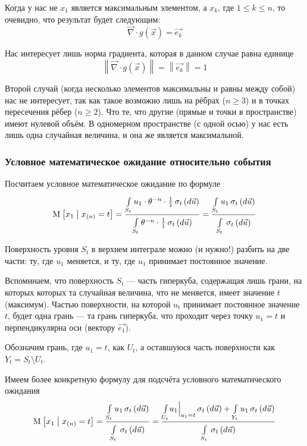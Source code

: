 Когда у нас не $x_1$ является максимальным элементом, а $x_k$,
где $1 \le k \le n$, то очевидно, что результат будет следующим:
$$\vec{\nabla} \cdot g\left( \vec{x} \right) = \vec{e_k}$$

Нас интересует лишь норма градиента, которая в данном случае равна единице
$$\left\| \vec{\nabla} \cdot g\left( \vec{x} \right) \right\|
    = \left\| \vec{e_k} \right\| = 1$$

Второй случай (когда несколько элементов максимальны и равны между собой)
нас не интересует, так как такое возможно лишь на рёбрах ($n \ge 3$) и в точках
пересечения рёбер ($n \ge 2$).
Что те, что другие (прямые и точки в пространстве) имеют нулевой объём.
В одномерном пространстве (с одной осью) у нас есть лишь одна
случайная величина, и она же является максимальной.

\subsubsection{Условное математическое ожидание относительно события}
Посчитаем условное математическое ожидание по формуле
\begin{align*}
    \Mean{x_1 \mcond x_{\left( n \right)} = t}
        = \frac{\integrall{S_t}{
                    \sigma_{t}\left(d\vec{u} \right)}{
                    u_1 \cdot \theta^{-n} \cdot \frac{1}{1}}}
                {\integrall{S_t}{\sigma_{t}\left(d\vec{u} \right)}{
                    \theta^{-n} \cdot \frac{1}{1}}}
        = \frac{\integrall{S_t}{
                    \sigma_{t}\left(d\vec{u} \right)}{u_1}}{
                \integrall{S_t}{
                    \sigma_{t}\left(d\vec{u} \right)}{}}
\end{align*}

Поверхность уровня $S_t$ в верхнем интеграле можно (и нужно!)
разбить на две части: ту, где $u_1$ меняется, и ту, где $u_1$
принимает постоянное значение.

Вспоминаем, что поверхность $S_t$ --- часть гиперкуба,
содержащая лишь грани, на которых которых та случайная величина,
что не меняется, имеет значение $t$ (максимум).
Частью поверхности, на которой $u_t$ принимает постоянное значение $t$,
будет одна грань --- та грань гиперкуба, что проходит через точку $u_1 = t$
и перпендикулярна оси (вектору $\vec{e_1}$).

Обозначим грань, где $u_1 = t$, как $U_t$,
а оставшуюся часть поверхности как $Y_t = S_t \setminus U_t$.

Имеем более конкретную формулу для подсчёта условного математического ожидания
\begin{align*}
    \Mean{x_1 \mcond x_{\left( n \right)} = t}
    = \frac{\integrall{S_t}{\sigma_{t}\left(d\vec{u} \right)}{u_1}}{
        \integrall{S_t}{\sigma_{t}\left(d\vec{u} \right)}{}}
    = \frac{\integrall{U_t}{\sigma_{t}\left(d\vec{u} \right)}{
                \Bigl. u_1 \Bigr|_{u_1 = t}}
            + \integrall{Y_t}{\sigma_{t}\left(d\vec{u} \right)}{
                u_1}}{
        \integrall{S_t}{\sigma_{t}\left(d\vec{u} \right)}{}}
\end{align*}

